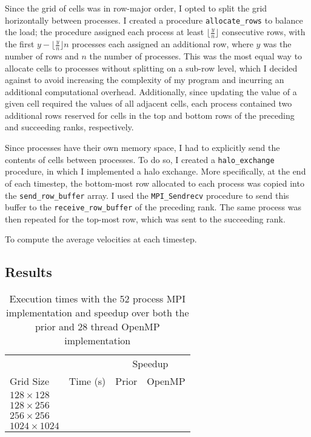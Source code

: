 \documentclass[twocolumn, a4paper]{article}
\begin{document}
Since the grid of cells was in row-major order, I opted to split the grid horizontally between processes.
I created a procedure \texttt{allocate\_rows} to balance the load; the procedure assigned each process at least $\lfloor\frac{y}{n}\rfloor$ consecutive rows, with the first $y - \lfloor\frac{y}{n}\rfloor n$ processes each assigned an additional row, where $y$ was the number of rows and $n$ the number of processes.
This was the most equal way to allocate cells to processes without splitting on a sub-row level, which I decided against to avoid increasing the complexity of my program and incurring an additional computational overhead.
Additionally, since updating the value of a given cell required the values of all adjacent cells, each process contained two additional rows reserved for cells in the top and bottom rows of the preceding and succeeding ranks, respectively.

Since processes have their own memory space, I had to explicitly send the contents of cells between processes.
To do so, I created a \texttt{halo\_exchange} procedure, in which I implemented a halo exchange.
More specifically, at the end of each timestep, the bottom-most row allocated to each process was copied into the \texttt{send\_row\_buffer} array.
I used the \texttt{MPI\_Sendrecv} procedure to send this buffer to the \texttt{receive\_row\_buffer} of the preceding rank.
The same process was then repeated for the top-most row, which was sent to the succeeding rank.

To compute the average velocities at each timestep.

\subsection{Results}

\begin{table}[htbp]
  \begin{center}
  \caption{Execution times with the 52 process MPI implementation and speedup over both the prior and 28 thread OpenMP implementation}\label{tab:mpi}
  \begin{tabular}[t]{l | l  l  l} 
      \hline\hline
      &&\multicolumn{2}{c}{Speedup}\\
      \cline{3-4}
      Grid Size&Time (s)&Prior&OpenMP\\
      \hline
      $128 \times 128$&\texttt{}&\texttt{}&\texttt{}\\
      $128 \times 256$&\texttt{}&\texttt{}&\texttt{}\\
      $256 \times 256$&\texttt{}&\texttt{}&\texttt{}\\
      $1024 \times 1024$&\texttt{}&\texttt{}&\texttt{}\\
      \hline
    \end{tabular}
  \end{center}
\end{table}
\end{document}
